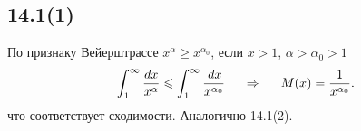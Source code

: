 \subsection*{14.1(1)}

По признаку Вейерштрассе $x^\alpha \geq x^{\alpha_0}$, если $x > 1$, $\alpha > \alpha_0 > 1$
\begin{equation*}
    \int_1^{\infty} \frac{dx}{x^\alpha} \leqslant \int_1^{\infty} \frac{\, d x}{x^{\alpha_0}}
    \hspace{0.5cm} \Rightarrow \hspace{0.5cm}
    M(x) = \frac{1}{x^{\alpha_0}}.
\end{equation*}
что соответствует сходимости. Аналогично 14.1(2).
